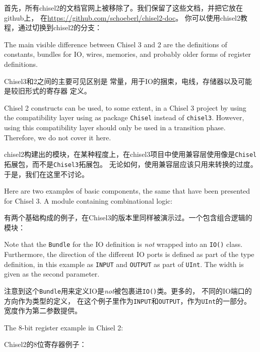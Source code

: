 \documentclass[%
    10pt,
    headinclude, footexclude,
    openright, %
    notitlepage,
    cleardoubleempty,
    headsepline,
    pointlessnumbers,
    bibtotoc, idxtotoc,
    ]{scrbook}
\newcommand{\code}[1]{{\small{\texttt{#1}}}}
\begin{document}
{{首先，所有chisel2的文档官网上被移除了。我们保留了这些文档，并把它放在github上，
在\url{https://github.com/schoeberl/chisel2-doc}。
你可以使用chisel2教程，通过切换到chisel2的分支：


The main visible difference between Chisel 3 and 2 are the definitions of
constants, bundles for IO, wires, memories, and probably older forms of register
definitions.

Chisel3和2之间的主要可见区别是
常量，用于IO的捆束，电线，存储器以及可能是较旧形式的寄存器
定义。

Chisel 2 constructs can be used, to some extent, in a Chisel 3 project by
using the compatibility layer using as package \code{Chisel} instead of \code{chisel3}.
However, using this compatibility layer should only be used in a transition phase.
Therefore, we do not cover it here.

chisel2构建出的模块，在某种程度上，在chisel3项目中使用兼容层使用像是\code{Chisel}拓展包，而不是\code{Chisel3}拓展包。
无论如何，使用兼容层应该只用来转换的过度。于是，我们在这里不讨论。

Here are two examples of basic components, the same that have been presented
for Chisel 3. A module containing combinational logic:

有两个基础构成的例子，在Chisel3的版本里同样被演示过。一个包含组合逻辑的模块：


Note that the \code{Bundle} for the IO definition is \emph{not} wrapped into
an \code{IO()} class.  Furthermore, the direction of the different IO ports is defined
as part of the type definition, in this example as \code{INPUT} and \code{OUTPUT}
as part of \code{UInt}. The width is given as the second parameter.

注意到这个\code{Bundle}用来定义IO是\emph{not}被包裹进\code{IO()}类。更多的， 不同的IO端口的方向作为类型的定义，
在这个例子里作为\code{INPUT}和\code{OUTPUT}，作为\code{UInt}的一部分。宽度作为第二参数提供。

\begin{minipage}{\linewidth}
The 8-bit register example in Chisel 2:

Chisel2的8位寄存器例子：

\end{minipage}

}}
\end{document}
